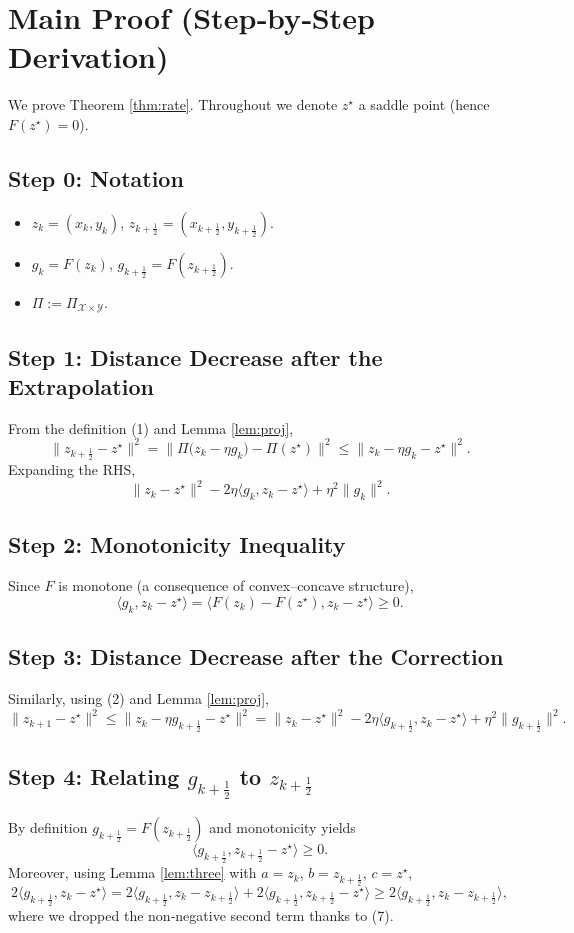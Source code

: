 \documentclass{article}
\begin{document}
\section{Main Proof (Step‑by‑Step Derivation)}
We prove Theorem \ref{thm:rate}.  Throughout we denote $z^{\star}$ a saddle point (hence $F(z^{\star})=0$).

\subsection*{Step 0: Notation}
\begin{itemize}
\item $z_{k}=(x_{k},y_{k})$, $z_{k+\frac12}=(x_{k+\frac12},y_{k+\frac12})$.
\item $g_{k}=F(z_{k})$, $g_{k+\frac12}=F(z_{k+\frac12})$.
\item $\Pi:=\Pi_{\mathcal{X}\times\mathcal{Y}}$.
\end{itemize}

\subsection*{Step 1: Distance Decrease after the Extrapolation}
From the definition (1) and Lemma \ref{lem:proj},
\[
\|z_{k+\frac12}-z^{\star}\|^{2}
= \bigl\|\Pi\!\bigl(z_{k}-\eta g_{k}\bigr)-\Pi(z^{\star})\bigr\|^{2}
\le \|z_{k}-\eta g_{k}-z^{\star}\|^{2}. \tag{3}
\]
Expanding the RHS,
\[
\|z_{k}-z^{\star}\|^{2}-2\eta\langle g_{k},z_{k}-z^{\star}\rangle+\eta^{2}\|g_{k}\|^{2}. \tag{4}
\]

\subsection*{Step 2: Monotonicity Inequality}
Since $F$ is monotone (a consequence of convex–concave structure),
\[
\langle g_{k},z_{k}-z^{\star}\rangle
=\langle F(z_{k})-F(z^{\star}),z_{k}-z^{\star}\rangle
\ge 0. \tag{5}
\]

\subsection*{Step 3: Distance Decrease after the Correction}
Similarly, using (2) and Lemma \ref{lem:proj},
\[
\|z_{k+1}-z^{\star}\|^{2}
\le \|z_{k}-\eta g_{k+\frac12}-z^{\star}\|^{2}
= \|z_{k}-z^{\star}\|^{2}-2\eta\langle g_{k+\frac12},z_{k}-z^{\star}\rangle+\eta^{2}\|g_{k+\frac12}\|^{2}. \tag{6}
\]

\subsection*{Step 4: Relating $g_{k+\frac12}$ to $z_{k+\frac12}$}
By definition $g_{k+\frac12}=F(z_{k+\frac12})$ and monotonicity yields
\[
\langle g_{k+\frac12},z_{k+\frac12}-z^{\star}\rangle\ge 0. \tag{7}
\]
Moreover, using Lemma \ref{lem:three} with $a=z_{k}$, $b=z_{k+\frac12}$, $c=z^{\star}$,
\[
2\langle g_{k+\frac12},z_{k}-z^{\star}\rangle
=2\langle g_{k+\frac12},z_{k}-z_{k+\frac12}\rangle
+2\langle g_{k+\frac12},z_{k+\frac12}-z^{\star}\rangle
\ge 2\langle g_{k+\frac12},z_{k}-z_{k+\frac12}\rangle, \tag{8}
\]
where we dropped the non‑negative second term thanks to (7).
\end{document}
